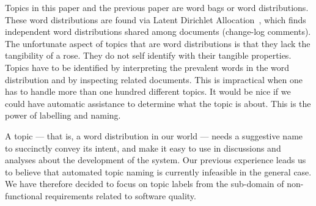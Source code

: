 \documentclass{acm_proc_article-sp}
\begin{document}

Topics in this paper and the previous paper are word bags or word distributions. These word distributions are found via Latent Dirichlet Allocation~\cite{Blei2003}, which finds independent word distributions shared among documents (change-log comments). The unfortunate aspect of topics that are word distributions is that they lack the tangibility of a rose. They do not self identify with their tangible properties. Topics have to be identified by interpreting the prevalent words in the word distribution and by inspecting related documents. This is impractical when one has to handle more than one hundred different topics. It would be nice if we could have automatic assistance to determine what the topic is about. This is the power of labelling and naming.



A topic --- that is, a word distribution in our world --- needs a suggestive name to succinctly convey its intent, and make it easy to use in discussions and analyses about the development of the system. Our previous experience leads us to believe that automated topic naming is currently infeasible in the general case. We have therefore decided to focus on topic labels from the sub-domain of non-functional requirements related to software quality.

\end{document}
